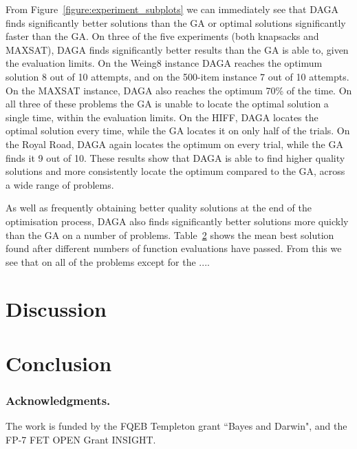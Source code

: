 \documentclass[runningheads,a4paper]{llncs}
\begin{document}
From Figure~\ref{figure:experiment_subplots}  we can immediately see that DAGA finds significantly better solutions than the GA or optimal solutions significantly faster than the GA. On three of the five experiments (both knapsacks and MAXSAT), DAGA finds significantly better results than the GA is able to, given the evaluation limits. On the Weing8 instance DAGA reaches the optimum solution 8 out of 10 attempts, and on the 500-item instance 7 out of 10 attempts. On the MAXSAT instance, DAGA also reaches the optimum 70\% of the time. On all three of these problems the GA is unable to locate the optimal solution a single time, within the evaluation limits. On the HIFF, DAGA locates the optimal solution every time, while the GA locates it on only half of the trials. On the Royal Road, DAGA again locates the optimum on every trial, while the GA finds it 9 out of 10. These results show that DAGA is able to find higher quality solutions and more consistently locate the optimum compared to the GA, across a wide range of problems.

As well as frequently obtaining better quality solutions at the end of the optimisation process, DAGA also finds significantly better solutions more quickly than the GA on a number of problems. Table~\ref{} shows the mean best solution found after different numbers of function evaluations have passed. From this we see that on all of the problems except for the ....




\section{Discussion}
\section{Conclusion}

\subsubsection*{Acknowledgments.} The work is funded by the FQEB Templeton grant ``Bayes and Darwin", and the FP-7 FET OPEN Grant INSIGHT.



\end{document}
